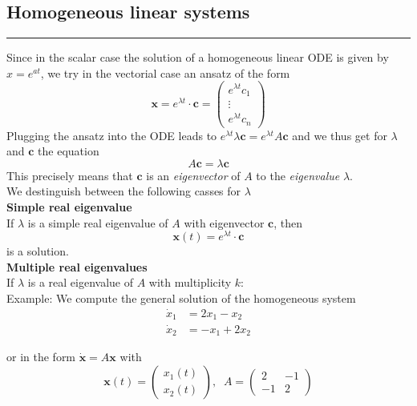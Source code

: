 \subsection{Homogeneous linear systems}
\noindent\rule[\linienAbstand]{\linewidth}{\linienDicke}
Since in the scalar case the solution of a homogeneous linear ODE is given by $x = e^{at}$, we try in the vectorial case an ansatz of the form
\begin{equation}
  \mathbf{x} = e^{\lambda t} \cdot \mathbf{c} =
  \begin{pmatrix}
    e^{\lambda t}c_1\\
    \vdots\\
    e^{\lambda t}c_n
  \end{pmatrix}
\end{equation}
Plugging the ansatz into the ODE leads to $e^{\lambda t}\lambda \mathbf{c} = e^{\lambda t} A\mathbf{c}$ and we thus get for $\lambda$ and $\mathbf{c}$ the equation
\begin{equation}
  A\mathbf{c} = \lambda \mathbf{c}
\end{equation}
This precisely means that $\mathbf{c}$ is an \emph{eigenvector} of $A$ to the \emph{eigenvalue} $\lambda$.\\

We destinguish between the following casses for $\lambda$\\
\textbf{Simple real eigenvalue}\\
If $\lambda$ is a simple real eigenvalue of $A$ with eigenvector $\mathbf{c}$, then
\begin{equation}
  \mathbf{x}(t) = e^{\lambda t} \cdot \mathbf{c}
\end{equation}
is a solution.\\

\textbf{Multiple real eigenvalues}\\
If $\lambda$ is a real eigenvalue of $A$ with multiplicity $k$:\\

Example: We compute the general solution of the homogeneous system
\begin{equation}
  \begin{split}
    \dot{x}_1 &= 2x_1 - x_2\\
    \dot{x}_2 &= -x_1 + 2x_2
  \end{split}
\end{equation}

or in the form $\dot{\mathbf{x}} = A\mathbf{x}$ with
\begin{equation}
  \mathbf{x}(t) = \begin{pmatrix}
    x_1(t)\\
    x_2(t)
  \end{pmatrix}
  , \;\; A = \begin{pmatrix}
      2 & -1\\
      -1 & 2
  \end{pmatrix}
\end{equation}

